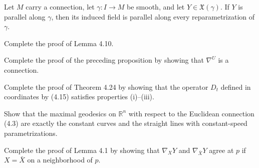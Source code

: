 \begin{proposition}
\label{prop:parallel-reparametrization}

Let $M$ carry a connection, let $\gamma\colon I\to M$ be smooth, and let
$Y\in\mathfrak X(\gamma)$. If $Y$ is parallel along $\gamma$, then its induced
field is parallel along every reparametrization of $\gamma$.
\end{proposition}

\begin{exercise}
\label{exer:complete-proof-lemma-4.10}


Complete the proof of Lemma 4.10.
\end{exercise}

\begin{exercise}\label{exer:connection-restriction-is-connection}
Complete the proof of the preceding proposition by showing that $\nabla^U$ is a connection.
\end{exercise}

\begin{exercise}
\label{exer:covariant-derivative-properties}
Complete the proof of Theorem 4.24 by showing that the operator $D_t$ defined in coordinates by (4.15) satisfies properties (i)--(iii).
\end{exercise}

\begin{exercise}
\label{exer:euclidean-geodesics}
Show that the maximal geodesics on $\mathbb{R}^n$ with respect to the Euclidean connection (4.3) are exactly the constant curves and the straight lines with constant-speed parametrizations.
\end{exercise}

\begin{exercise}\label{exer:lemma-4-1-comparison}
Complete the proof of Lemma 4.1 by showing that $\nabla_X Y$ and $\nabla_{\bar{X}} Y$ agree at $p$ if $X = \bar{X}$ on a neighborhood of $p$.
\end{exercise}

